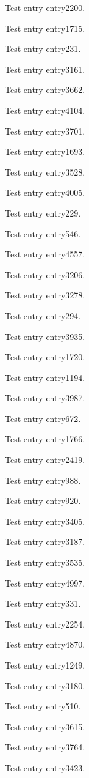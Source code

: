 Test entry \gls{entry2200}.

Test entry \gls{entry1715}.

Test entry \gls{entry231}.

Test entry \gls{entry3161}.

Test entry \gls{entry3662}.

Test entry \gls{entry4104}.

Test entry \gls{entry3701}.

Test entry \gls{entry1693}.

Test entry \gls{entry3528}.

Test entry \gls{entry4005}.

Test entry \gls{entry229}.

Test entry \gls{entry546}.

Test entry \gls{entry4557}.

Test entry \gls{entry3206}.

Test entry \gls{entry3278}.

Test entry \gls{entry294}.

Test entry \gls{entry3935}.

Test entry \gls{entry1720}.

Test entry \gls{entry1194}.

Test entry \gls{entry3987}.

Test entry \gls{entry672}.

Test entry \gls{entry1766}.

Test entry \gls{entry2419}.

Test entry \gls{entry988}.

Test entry \gls{entry920}.

Test entry \gls{entry3405}.

Test entry \gls{entry3187}.

Test entry \gls{entry3535}.

Test entry \gls{entry4997}.

Test entry \gls{entry331}.

Test entry \gls{entry2254}.

Test entry \gls{entry4870}.

Test entry \gls{entry1249}.

Test entry \gls{entry3180}.

Test entry \gls{entry510}.

Test entry \gls{entry3615}.

Test entry \gls{entry3764}.

Test entry \gls{entry3423}.

